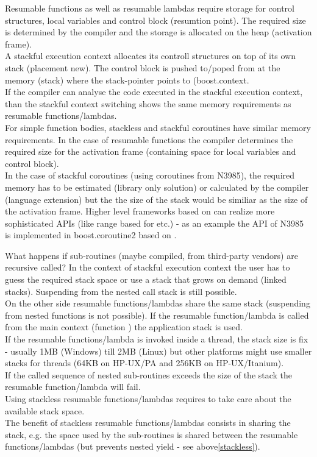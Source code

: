 Resumable functions as well as resumable lambdas require storage for control
structures, local variables and control block (resumtion point). The required
size is determined by the compiler and the storage is allocated on the heap
(activation frame).\\
A stackful execution context allocates its controll structures on top of its own
stack (placement new). The control block is pushed to/poped from at the
memory (stack) where the stack-pointer points to (boost.context\cite{bcontext}.\\
If the compiler can analyse the code executed in the stackful execution context,
than the stackful context switching shows the same memory requirements as
resumable functions/lambdas.\\
\newline
For simple function bodies, stackless and stackful coroutines have similar
memory requirements.
In the case of resumable functions the compiler determines the required size for
the activation frame (containing space for local variables and control block).\\
In the case of stackful coroutines (using coroutines from N3985), the required
memory has to be estimated (library only solution) or calculated by the compiler
(language extension) but the the size of the stack would be similiar as the size
of the activation frame.
Higher level frameworks based on \ectx can realize more sophisticated APIs
(like range based for etc.) - as an example the API of N3985\cite{N3985} is
implemented in boost.coroutine2\cite{bcoroutine2} based on
.

What happens if sub-routines (maybe compiled, from third-party vendors) are
recursive called? In the context of stackful execution context
the user has to guess the required stack space or use a stack that grows on
demand (linked stacks). Suspending from the nested call stack is still
possible.\\
On the other side resumable functions/lambdas share the same stack (suspending
from nested functions is not possible). If the resumable function/lambda is
called from the main context (function \main) the application stack is used.\\
If the resumable functions/lambda is invoked inside a thread, the stack size is
fix - usually 1MB (Windows) till 2MB (Linux) but other platforms might use
smaller stacks for threads (64KB on HP-UX/PA and 256KB on HP-UX/Itanium).\\
If the called sequence of nested sub-routines exceeds the size of the stack the
resumable function/lambda will fail.\\
\newline
Using stackless resumable functions/lambdas requires to take care about the
available stack space.\\
The benefit of stackless resumable functions/lambdas consists in sharing the
stack, e.g. the space used by the sub-routines is shared between the resumable
functions/lambdas (but prevents nested yield - see above\ref{stackless}).

